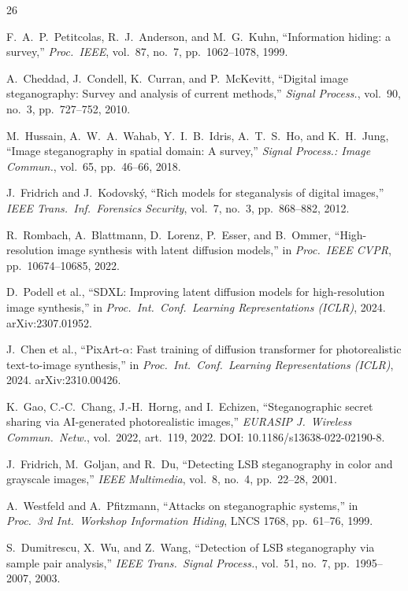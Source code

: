 \documentclass[10pt,twocolumn,a4paper]{article}
\begin{document}
\begin{thebibliography}{26}
\small

F.~A.~P.~Petitcolas, R.~J.~Anderson, and M.~G.~Kuhn,
``Information hiding: a survey,''
\textit{Proc.\ IEEE}, vol.~87, no.~7, pp.~1062--1078, 1999.

A.~Cheddad, J.~Condell, K.~Curran, and P.~McKevitt,
``Digital image steganography: Survey and analysis of current methods,''
\textit{Signal Process.}, vol.~90, no.~3, pp.~727--752, 2010.

M.~Hussain, A.~W.~A.~Wahab, Y.~I.~B.~Idris, A.~T.~S.~Ho, and K.~H.~Jung,
``Image steganography in spatial domain: A survey,''
\textit{Signal Process.: Image Commun.}, vol.~65, pp.~46--66, 2018.

J.~Fridrich and J.~Kodovsk\'{y},
``Rich models for steganalysis of digital images,''
\textit{IEEE Trans.\ Inf.\ Forensics Security}, vol.~7, no.~3, pp.~868--882, 2012.

R.~Rombach, A.~Blattmann, D.~Lorenz, P.~Esser, and B.~Ommer,
``High-resolution image synthesis with latent diffusion models,''
in \textit{Proc.\ IEEE CVPR}, pp.~10674--10685, 2022.

D.~Podell et al.,
``SDXL: Improving latent diffusion models for high-resolution image synthesis,''
in \textit{Proc.\ Int.\ Conf.\ Learning Representations (ICLR)}, 2024.
arXiv:2307.01952.

J.~Chen et al.,
``PixArt-$\alpha$: Fast training of diffusion transformer for photorealistic text-to-image synthesis,''
in \textit{Proc.\ Int.\ Conf.\ Learning Representations (ICLR)}, 2024.
arXiv:2310.00426.

K.~Gao, C.-C.~Chang, J.-H.~Horng, and I.~Echizen,
``Steganographic secret sharing via AI-generated photorealistic images,''
\textit{EURASIP J.\ Wireless Commun.\ Netw.}, vol.~2022, art.~119, 2022.
DOI: 10.1186/s13638-022-02190-8.

J.~Fridrich, M.~Goljan, and R.~Du,
``Detecting LSB steganography in color and grayscale images,''
\textit{IEEE Multimedia}, vol.~8, no.~4, pp.~22--28, 2001.

A.~Westfeld and A.~Pfitzmann,
``Attacks on steganographic systems,''
in \textit{Proc.\ 3rd Int.\ Workshop Information Hiding}, LNCS 1768, pp.~61--76, 1999.

S.~Dumitrescu, X.~Wu, and Z.~Wang,
``Detection of LSB steganography via sample pair analysis,''
\textit{IEEE Trans.\ Signal Process.}, vol.~51, no.~7, pp.~1995--2007, 2003.


\end{thebibliography}
\end{document}
